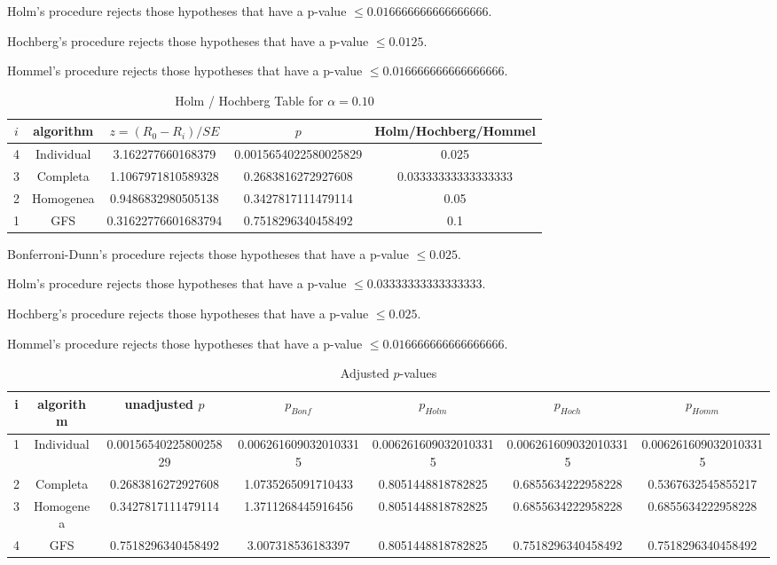 \documentclass[a4paper,10pt]{article}
\begin{document}
\begin{landscape}
Holm's procedure rejects those hypotheses that have a p-value $\le0.016666666666666666$.


Hochberg's procedure rejects those hypotheses that have a p-value $\le0.0125$.


Hommel's procedure rejects those hypotheses that have a p-value $\le0.016666666666666666$.


\begin{table}[!htp]
\centering\tiny
\caption{Holm / Hochberg Table for $\alpha=0.10$}
\begin{tabular}{ccccc}
$i$&algorithm&$z=(R_0 - R_i)/SE$&$p$&Holm/Hochberg/Hommel\\
\hline
4&Individual&3.162277660168379&0.0015654022580025829&0.025\\
3&Completa&1.1067971810589328&0.2683816272927608&0.03333333333333333\\
2&Homogenea&0.9486832980505138&0.3427817111479114&0.05\\
1&GFS&0.31622776601683794&0.7518296340458492&0.1\\
\hline
\end{tabular}
\end{table}
Bonferroni-Dunn's procedure rejects those hypotheses that have a p-value $\le0.025$.


Holm's procedure rejects those hypotheses that have a p-value $\le0.03333333333333333$.


Hochberg's procedure rejects those hypotheses that have a p-value $\le0.025$.


Hommel's procedure rejects those hypotheses that have a p-value $\le0.016666666666666666$.


\begin{table}[!htp]
\centering\tiny
\caption{Adjusted $p$-values}
\begin{tabular}{ccccccc}
i&algorithm&unadjusted $p$&$p_{Bonf}$&$p_{Holm}$&$p_{Hoch}$&$p_{Homm}$\\
\hline
1&Individual&0.0015654022580025829&0.0062616090320103315&0.0062616090320103315&0.0062616090320103315&0.0062616090320103315\\
2&Completa&0.2683816272927608&1.0735265091710433&0.8051448818782825&0.6855634222958228&0.5367632545855217\\
3&Homogenea&0.3427817111479114&1.3711268445916456&0.8051448818782825&0.6855634222958228&0.6855634222958228\\
4&GFS&0.7518296340458492&3.007318536183397&0.8051448818782825&0.7518296340458492&0.7518296340458492\\
\hline
\end{tabular}
\end{table}


\end{landscape}
\end{document}

